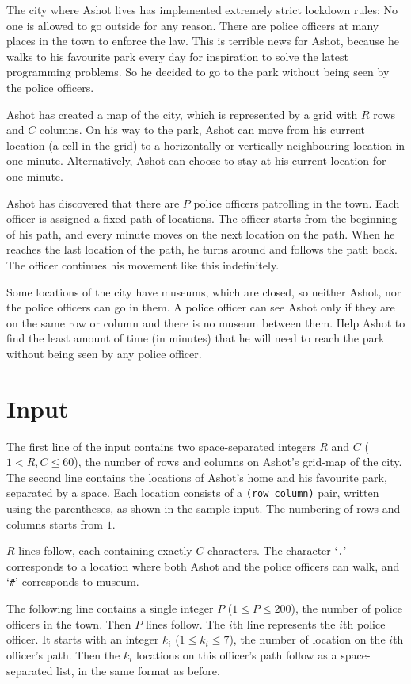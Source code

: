 The city where Ashot lives has implemented extremely strict lockdown rules: No one is allowed to go outside for any reason.
There are police officers at many places in the town to enforce the law.
This is terrible news for Ashot, because he walks to his favourite park every day for inspiration to solve the latest programming problems.
So he decided to go to the park without being seen by the police officers.

Ashot has created a map of the city, which is represented by a grid with $R$ rows and $C$ columns.
On his way to the park, Ashot can move from his current location (a cell in the grid) to a horizontally or vertically neighbouring location in one minute.
Alternatively, Ashot can choose to stay at his current location for one minute.

Ashot has discovered that there are $P$ police officers patrolling in the town.
Each officer is assigned a fixed path of locations.
The officer starts from the beginning of his path, and
every minute moves on the next location on the path.
When he reaches the last location of the path, he turns around and follows the path back.
The officer continues his movement like this indefinitely.

Some locations of the city have museums, which are closed, so neither Ashot, nor the police officers can go in them.
A police officer can see Ashot only if they are on the same row or column and there is no museum between them.
Help Ashot to find the least amount of time (in minutes) that he will need to reach the park without being seen by any police officer.

\section*{Input}
The first line of the input contains two space-separated integers $R$ and $C$ ($1 < R, C \leq 60$), the number of rows and columns on Ashot's grid-map of the city.
The second line contains the locations of Ashot's home and his favourite park, separated by a space.
Each location consists of a \texttt{(row column)} pair, written using the parentheses, as shown in the sample input.
The numbering of rows and columns starts from $1$.

$R$ lines follow, each containing exactly $C$ characters.
The character `\texttt{.}' corresponds to a location where both Ashot and the police officers can walk, and `\texttt{\#}' corresponds to museum.

The following line contains a single integer $P$ ($1 \leq P \leq 200$), the number of police officers in the town.
Then $P$ lines follow.
The $i$th line represents the $i$th police officer.
It starts with an integer $k_i$ ($1 \leq k_i \leq 7$), the number of location on the $i$th officer's path.
Then the $k_i$ locations on this officer's path follow as a space-separated list, in the same format as before.

